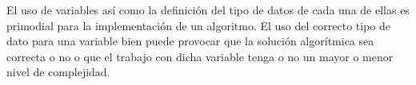 El uso de variables así como la definición del tipo de datos de cada una de ellas es primodial para la implementación de un algoritmo. El uso del correcto tipo de dato para una variable bien puede provocar que la solución algorítmica sea correcta o no o que el trabajo con dicha variable tenga o no un mayor o menor nivel de complejidad. 